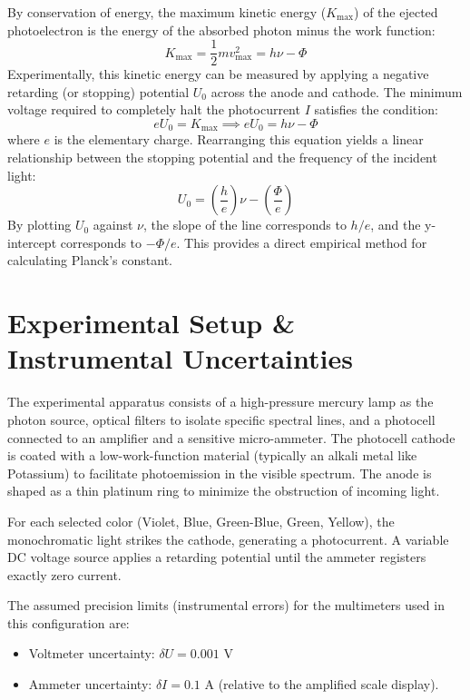 \documentclass[a4paper,11pt]{article}
\begin{document}
By conservation of energy, the maximum kinetic energy ($K_{\text{max}}$) of the ejected photoelectron is the energy of the absorbed photon minus the work function:
\begin{equation}
    K_{\text{max}} = \frac{1}{2} m v_{\text{max}}^2 = h \nu - \Phi
\end{equation}
Experimentally, this kinetic energy can be measured by applying a negative retarding (or stopping) potential $U_0$ across the anode and cathode. The minimum voltage required to completely halt the photocurrent $I$ satisfies the condition:
\begin{equation}
    e U_0 = K_{\text{max}} \implies e U_0 = h \nu - \Phi
\end{equation}
where $e$ is the elementary charge. Rearranging this equation yields a linear relationship between the stopping potential and the frequency of the incident light:
\begin{equation}
    U_0 = \left( \frac{h}{e} \right) \nu - \left( \frac{\Phi}{e} \right)
\end{equation}
By plotting $U_0$ against $\nu$, the slope of the line corresponds to $h/e$, and the y-intercept corresponds to $-\Phi/e$. This provides a direct empirical method for calculating Planck's constant.

\section{Experimental Setup \& Instrumental Uncertainties}
The experimental apparatus consists of a high-pressure mercury lamp as the photon source, optical filters to isolate specific spectral lines, and a photocell connected to an amplifier and a sensitive micro-ammeter. The photocell cathode is coated with a low-work-function material (typically an alkali metal like Potassium) to facilitate photoemission in the visible spectrum. The anode is shaped as a thin platinum ring to minimize the obstruction of incoming light.

For each selected color (Violet, Blue, Green-Blue, Green, Yellow), the monochromatic light strikes the cathode, generating a photocurrent. A variable DC voltage source applies a retarding potential until the ammeter registers exactly zero current. 

The assumed precision limits (instrumental errors) for the multimeters used in this configuration are:
\begin{itemize}
    \item Voltmeter uncertainty: $\delta U = 0.001\text{ V}$
    \item Ammeter uncertainty: $\delta I = 0.1\text{ A}$ (relative to the amplified scale display).
\end{itemize}
\end{document}
